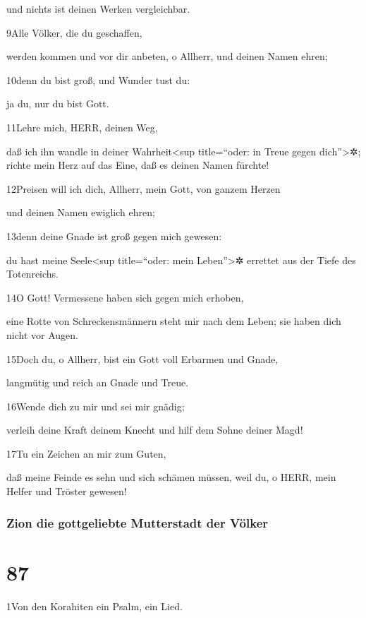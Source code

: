 und nichts ist deinen Werken vergleichbar.

9Alle Völker, die du geschaffen,

werden kommen und vor dir anbeten, o Allherr, und deinen Namen ehren;

10denn du bist groß, und Wunder tust du:

ja du, nur du bist Gott.

11Lehre mich, HERR, deinen Weg,

daß ich ihn wandle in deiner Wahrheit\textless sup title=``oder: in
Treue gegen dich''\textgreater✲; richte mein Herz auf das Eine, daß es
deinen Namen fürchte!

12Preisen will ich dich, Allherr, mein Gott, von ganzem Herzen

und deinen Namen ewiglich ehren;

13denn deine Gnade ist groß gegen mich gewesen:

du hast meine Seele\textless sup title=``oder: mein Leben''\textgreater✲
errettet aus der Tiefe des Totenreichs.

14O Gott! Vermessene haben sich gegen mich erhoben,

eine Rotte von Schreckensmännern steht mir nach dem Leben; sie haben
dich nicht vor Augen.

15Doch du, o Allherr, bist ein Gott voll Erbarmen und Gnade,

langmütig und reich an Gnade und Treue.

16Wende dich zu mir und sei mir gnädig;

verleih deine Kraft deinem Knecht und hilf dem Sohne deiner Magd!

17Tu ein Zeichen an mir zum Guten,

daß meine Feinde es sehn und sich schämen müssen, weil du, o HERR, mein
Helfer und Tröster gewesen!

\hypertarget{zion-die-gottgeliebte-mutterstadt-der-vuxf6lker}{%
\subsubsection{Zion die gottgeliebte Mutterstadt der
Völker}\label{zion-die-gottgeliebte-mutterstadt-der-vuxf6lker}}

\hypertarget{section-86}{%
\section{87}\label{section-86}}

1Von den Korahiten ein Psalm, ein Lied.

